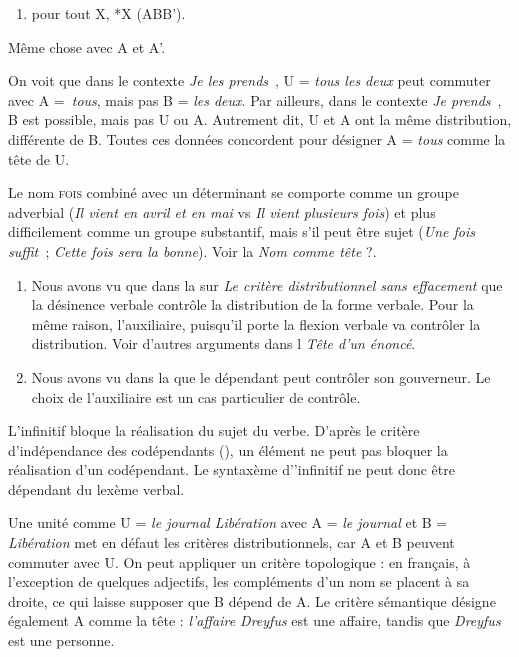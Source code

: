 {    \begin{enumerate}[label=4.] \item   pour tout X, *X (ABB’).\end{enumerate}
    Même chose avec A et A’.

     On voit que dans le contexte \textit{Je les prends}~{\longrule}, U = \textit{tous les deux} peut commuter avec A =~\textit{tous}, mais pas B = \textit{les deux}. Par ailleurs, dans le contexte \textit{Je prends}~{\longrule}, B est possible, mais pas U ou A. Autrement dit, U et A ont la même distribution, différente de B. Toutes ces données concordent pour désigner A = \textit{tous} comme la tête de U.

     Le nom \textsc{fois} combiné avec un déterminant se comporte comme un groupe adverbial (\textit{Il vient en avril et en mai} vs \textit{Il vient plusieurs fois}) et plus difficilement comme un groupe substantif, mais s’il peut être sujet (\textit{Une fois suffit~}; \textit{Cette fois sera la bonne}). Voir la  \textit{Nom comme tête} ?.

    \begin{enumerate}[label=\alph*.]
    \item Nous avons vu que dans la  sur \textit{Le critère distributionnel sans effacement} que la désinence verbale contrôle la distribution de la forme verbale. Pour la même raison, l’auxiliaire, puisqu’il porte la flexion verbale va contrôler la distribution. Voir d’autres arguments dans l \textit{Tête d’un énoncé}.

    \item Nous avons vu dans la  que le dépendant peut contrôler son gouverneur. Le choix de l’auxiliaire est un cas particulier de contrôle.
    \end{enumerate}

     L’infinitif bloque la réalisation du sujet du verbe. D’après le critère d’indépendance des codépendants (), un élément ne peut pas bloquer la réalisation d’un codépendant. Le syntaxème d’’infinitif ne peut donc être dépendant du lexème verbal.

     Une unité comme U = \textit{le journal Libération} avec A = \textit{le journal} et B = \textit{Libération} met en défaut les critères distributionnels, car A et B peuvent commuter avec U. On peut appliquer un critère topologique : en français, à l’exception de quelques adjectifs, les compléments d’un nom se placent à sa droite, ce qui laisse supposer que B dépend de A. Le critère sémantique désigne également A comme la tête : \textit{l’affaire Dreyfus} est une affaire, tandis que \textit{Dreyfus} est une personne.

}
